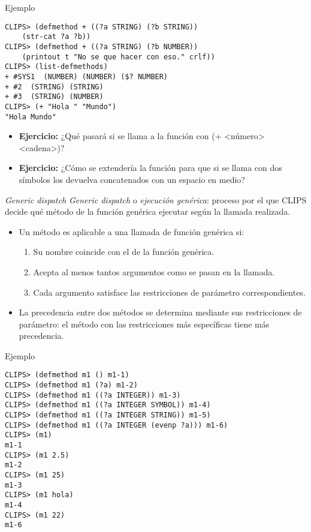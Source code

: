 \documentclass[usenames,dvipsnames,aspectratio=169]{beamer}
\begin{document}
\begin{frame}[fragile]{Ejemplo}
	\small
	\begin{verbatim}
CLIPS> (defmethod + ((?a STRING) (?b STRING))
    (str-cat ?a ?b))
CLIPS> (defmethod + ((?a STRING) (?b NUMBER))
    (printout t "No se que hacer con eso." crlf))
CLIPS> (list-defmethods)
+ #SYS1  (NUMBER) (NUMBER) ($? NUMBER)
+ #2  (STRING) (STRING)
+ #3  (STRING) (NUMBER)
CLIPS> (+ "Hola " "Mundo")
"Hola Mundo"
	\end{verbatim}
	\begin{itemize}
		\item \textbf{Ejercicio:} ¿Qué pasará si se llama a la función con (+ <número> <cadena>)?
		\item \textbf{Ejercicio:} ¿Cómo se extendería la función para que si se llama con dos símbolos los devuelva concatenados con un espacio en medio?
	\end{itemize}
\end{frame}

\begin{frame}{\textit{Generic dispatch}}
	\textit{Generic dispatch} o \textit{ejecución genérica}: proceso por el que CLIPS decide qué método de la función genérica ejecutar según la llamada realizada.
	\begin{itemize}
		\item Un método es aplicable a una llamada de función genérica si:
		\begin{enumerate}
			\item Su nombre coincide con el de la función genérica.
			\item Acepta al menos tantos argumentos como se pasan en la llamada.
			\item Cada argumento satisface las restricciones de parámetro correspondientes.
		\end{enumerate}
		\item La precedencia entre dos métodos se determina mediante sus restricciones de parámetro: el método con las restricciones más específicas tiene más precedencia.
	\end{itemize}
\end{frame}

\begin{frame}[fragile]{Ejemplo}
	\small
	\begin{verbatim}
CLIPS> (defmethod m1 () m1-1)
CLIPS> (defmethod m1 (?a) m1-2)
CLIPS> (defmethod m1 ((?a INTEGER)) m1-3)
CLIPS> (defmethod m1 ((?a INTEGER SYMBOL)) m1-4)
CLIPS> (defmethod m1 ((?a INTEGER STRING)) m1-5)
CLIPS> (defmethod m1 ((?a INTEGER (evenp ?a))) m1-6)
CLIPS> (m1)
m1-1
CLIPS> (m1 2.5)
m1-2
CLIPS> (m1 25)
m1-3
CLIPS> (m1 hola)
m1-4
CLIPS> (m1 22)
m1-6
	\end{verbatim}
\end{frame}
\end{document}
